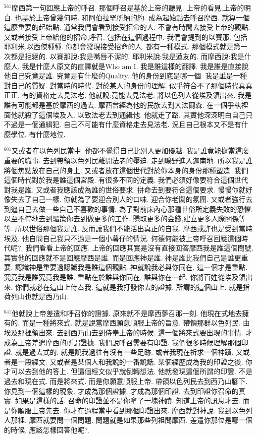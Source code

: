 \documentclass{book}
\begin{document}
$^{561}$摩西第一句回應上帝的呼召.
那個呼召是基於上帝的聽見.
上帝的看見,上帝的明白.
也基於上帝曾幾何時.
和阿伯拉罕所納的約.
成為起始點去呼召摩西.
就算一個這麼重要的起始點.
通常我們會看到接受招命的人.
不會有時間去接受上帝的觀點.
又或者接受上帝給他的招命,呼召.
包括在這個過程中.
我們會提到的以賽那.
包括耶利米,以西傑種種.
你都會發現接受招命的人.
都有一種模式.
那個模式就是第一次都是拒絕的.
以賽那說:我是嘴唇不潔的.
耶利米說:我是蓮友的.
而摩西說:我是什麼人.
我是什麼人原文的直譯就是Who am I.
我是誰這樣的翻譯.
我是誰是直接說他自己究竟是誰.
究竟是有什麼的Quality.
他的身份到底是哪一個.
我是誰是一種對自己的質疑.
對當時的時代.
對於某人的身份的理解.
似乎符合不了那個時代真真正正.
有的資格走去見法老.
他就說:竟能去見法老.
將以色列人從埃及領出來.
我是誰有可能都是基於摩西的過去.
摩西曾經為他的民族去到大法爾森.
在一個爭執裡面他就殺了這個埃及人.
以致法老去到通緝他.
他就走了路.
其實他深深明白自己只不過是一個通緝犯.
自己不可能有什麼資格走去見法老.
況且自己根本又不是有什麼學位.
有什麼地位.

$^{601}$又或者在以色列民當中.
他都不覺得自己比別人更加優越.
我是誰竟能擔當這麼重要的職事.
去到帶領以色列民離開法老的壓迫.
走到曠野進入迦南地.
所以我是誰將個焦點放在自己的身上.
又或者放在這個世代對於你本身的身份那種塑造.
我們這個時代對於我是誰這個宮殿.
有很多不同的定義.
我們必須好像要符合這個世代對我是誰.
又或者我應該成為誰的世俗要求.
拼命去到要符合這個要求.
慢慢你就好像失去了自己一樣.
你就為了要迎合別人的口味.
迎合你老闆的氛圍.
又或者強行去到逼自己去做一些自己不喜歡的事情.
為了對前床內心那種世俗所定義失敗的恐懼.
以至不停地去到驅策你去到做更多的工作.
賺取更多的金錢,建立更多人際關係等等.
所以世俗那個我是誰.
反而讓我們不能活出真正的自我.
摩西或許也是受到當時埃及.
他自問自己我只不過是一個小薯仔的情況.
何德何能被上帝呼召回應這個時代呢?.
我們看看上帝的回應.
上帝的回應其實是沒有直接回答摩西我是誰這個問號.
其實他的回應就不是回應摩西是誰.
而是回應神是誰.
神是誰比我們自己是誰更重要.
認識神是重要過認識我是誰這個觀點.
神就說我必與你同在.
這一個才是重點.
究竟我是誰究竟我是誰.
重點在於誰與你同在.
誰與你在一起.
你將百姓從埃及領出來.
你們就必在這山上侍奉我.
這就是我打發你去的證據.
所謂的這個山上.
就是指荷列山也就是西乃山.

$^{641}$他就說上帝差遣和呼召你的證據.
原來就不是摩西夢召那一刻.
他現在式地去擁有的.
而是一種將來式.
就是說當摩西願意順服上帝的旨意.
帶領那群以色列民.
由埃及那裡領出來.
去到西乃山去到侍奉上帝的時候.
這一個將來式要出現的事情.
才成為上帝差遣摩西的所謂證據.
我們說呼召需要有印證.
我們很多時候理解那個印證.
就是過去式的.
就是說我過往有沒有一些足跡.
或者我現在祈求一個神蹟.
又或者是一段經文.
又或者是某個人和我說的一番說話.
某個經歷成為我的印證之後.
你才可以去到他的答上.
但這個經文似乎就倒轉想法.
他就發現這個所謂的印證.
不是過去和現在式.
而是將來式.
而是你願意順服上帝.
帶領以色列民去到西乃山腳下.
你見到一個這樣的現象.
才成為那個證據.
才成為那個印證.
去到印證你召命的真實.
如果是這樣的話.
召命的印證並不是你拿了一塊神蹟.
知道上帝的訊息才去.
而是你順服上帝先去.
你才在過程當中看到那個印證出來.
摩西就對神說.
我到以色列人那裡.
摩西就要問一個問題.
問題就是如果那些列祖問摩西.
差遣你那位是哪一個的時候.
應該怎樣回答他呢?.
\end{document}
